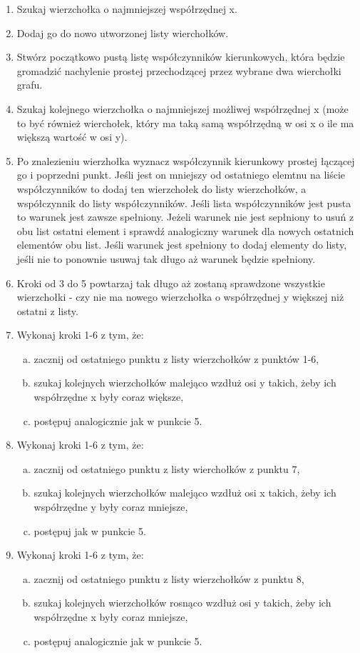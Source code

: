 \documentclass[10pt,a4paper]{article}
\begin{document}
\begin{enumerate}
    \item Szukaj wierzchołka o najmniejszej współrzędnej x.
    \item Dodaj go do nowo utworzonej listy wierchołków.
    \item Stwórz początkowo pustą listę współczynników kierunkowych, która będzie gromadzić nachylenie prostej przechodzącej przez wybrane dwa wierchołki grafu.
    \item Szukaj kolejnego wierzchołka o najmniejszej możliwej współrzędnej x (może to być również wierchołek, który ma taką samą współrzędną w osi x o ile ma większą wartość w osi y).
    \item Po znalezieniu wierzhołka wyznacz współczynnik kierunkowy prostej łączącej go i poprzedni punkt. Jeśli jest on mniejszy od ostatniego elemtnu na liście współczynników to dodaj ten wierzchołek do listy wierzchołków, a współczynnik do listy współczynników. Jeśli lista współczynników jest pusta to warunek jest zawsze spełniony. Jeżeli warunek nie jest sepłniony to usuń z obu list ostatni element i sprawdź analogiczny warunek dla nowych ostatnich elementów obu list. Jeśli warunek jest spełniony to dodaj elementy do listy, jeśli nie to ponownie usuwaj tak długo aż warunek będzie spełniony.
    \item Kroki od 3 do 5 powtarzaj tak długo aż zostaną sprawdzone wszystkie wierzchołki - czy nie ma nowego wierzchołka o współrzędnej y większej niż ostatni z listy.
    \item Wykonaj kroki 1-6 z tym, że:
    \begin{enumerate}[a)]
        \item zacznij od ostatniego punktu z listy wierzchołków z punktów 1-6,
        \item szukaj kolejnych wierzchołków malejąco wzdłuż osi y takich, żeby ich współrzędne x były coraz większe,
        \item postępuj analogicznie jak w punkcie 5.
    \end{enumerate}
    \item Wykonaj kroki 1-6 z tym, że:
    \begin{enumerate}[a)]
        \item zacznij od ostatniego punktu z listy wierchołków z punktu 7,
        \item szukaj kolejnych wierzchołków malejąco wzdłuż osi x takich, żeby ich współrzędne y były coraz mniejsze,
        \item postępuj jak w punkcie 5.
    \end{enumerate}
    \item Wykonaj kroki 1-6 z tym, że:
    \begin{enumerate}[a)]
        \item zacznij od ostatniego punktu z listy wierzchołków z punktu 8,
        \item szukaj kolejnych wierzchołków rosnąco wzdłuż osi y takich, żeby ich współrzędne x były coraz mniejsze,
        \item postępuj analogicznie jak w punkcie 5.
    \end{enumerate}
\end{enumerate}
\end{document}
